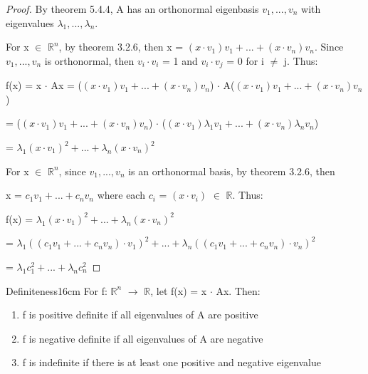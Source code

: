     \begin{proof}
        By {\color{red} theorem 5.4.4}, A has an orthonormal eigenbasis
        $v_1,...,v_n$ with eigenvalues $\lambda_1,...,\lambda_n$.
        
        For x $\in$ $\mathbb{R}^n$, by {\color{red} theorem 3.2.6},
        then x = $(x \cdot v_1)v_1 + ... + (x \cdot v_n)v_n$.
        Since $v_1,...,v_n$ is orthonormal, then $v_i \cdot v_i$ = 1
        and $v_i \cdot v_j$ = 0 for i $\not =$ j. Thus:

        \hspace{0.5cm}
        f(x) = x $\cdot$ Ax
        = ($(x \cdot v_1)v_1 + ... + (x \cdot v_n)v_n$)
            $\cdot$ A($(x \cdot v_1)v_1 + ... + (x \cdot v_n)v_n$)

        \hspace{1.3cm}
        = ($(x \cdot v_1)v_1 + ... + (x \cdot v_n)v_n$)
            $\cdot$ ($(x \cdot v_1)\lambda_1v_1 +...+ (x \cdot v_n)\lambda_nv_n$)

        \hspace{1.3cm}
        = $\lambda_1(x \cdot v_1)^2 + ... + \lambda_n(x \cdot v_n)^2$

        For x $\in$ $\mathbb{R}^n$,
        since $v_1,...,v_n$ is an orthonormal basis,
        by {\color{red} theorem 3.2.6}, then
        
        x = $c_1v_1 + ... + c_nv_n$ where each
        $c_i$ = $(x \cdot v_i)$ $\in$ $\mathbb{R}$. Thus:

        \hspace{0.5cm}
        f(x)
        = $\lambda_1(x \cdot v_1)^2 + ... + \lambda_n(x \cdot v_n)^2$

        \hspace{1.3cm}
        = $\lambda_1((c_1v_1 + ... + c_nv_n) \cdot v_1)^2
            + ... + \lambda_n((c_1v_1 + ... + c_nv_n) \cdot v_n)^2$

        \hspace{1.3cm}
        = $\lambda_1c_1^2 + ... + \lambda_nc_n^2$
    \end{proof}

    \newpage



    \begin{definition}{Definiteness}{16cm}
        For f: $\mathbb{R}^n$ $\rightarrow$ $\mathbb{R}$,
        let f(x) = x $\cdot$ Ax. Then:

        \begin{enumerate}[label=(\alph*), leftmargin=1cm, itemsep=0.1cm]
            \item f is {\color{lgreen} positive definite} if all
                eigenvalues of A are positive

            \item f is {\color{lgreen} negative definite} if all
                eigenvalues of A are negative

            \item f is {\color{lgreen} indefinite} if there is at least one
                positive and negative eigenvalue
        \end{enumerate}
    \end{definition}

